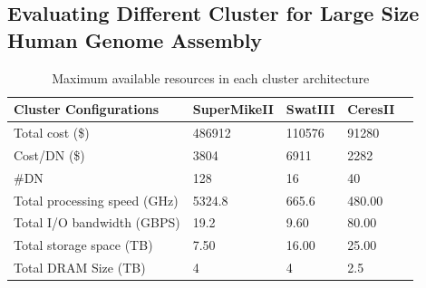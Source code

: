 \documentclass[journal]{IEEEtran}
\begin{document}
\subsection{Evaluating Different Cluster for Large Size Human Genome Assembly}
\begin{table}[!t]
\caption{Maximum available resources in each cluster architecture}
\label{tab:TotalCluster}
\label{fig:perf}
\centering
\begin{tabular}{|p{2.5cm}|p{1.5cm}|p{1.5cm}|p{1.5cm}|p{1.5cm}|} \hline
Cluster Configurations & SuperMikeII & SwatIII & CeresII\\ \hline
Total cost (\$) & 486912 & 110576 & 91280\\ \hline
Cost/DN (\$) & 3804 & 6911 & 2282\\ \hline
\#DN & 128 & 16 & 40\\ \hline
Total processing speed (GHz) & 5324.8 & 665.6 & 480.00\\ \hline
Total I/O bandwidth (GBPS) & 19.2 & 9.60 & 80.00\\ \hline
Total storage space (TB) & 7.50 & 16.00 & 25.00\\ \hline
Total DRAM Size (TB) & 4 & 4 & 2.5\\ \hline
\end{tabular}
\end{table}
\end{document}
